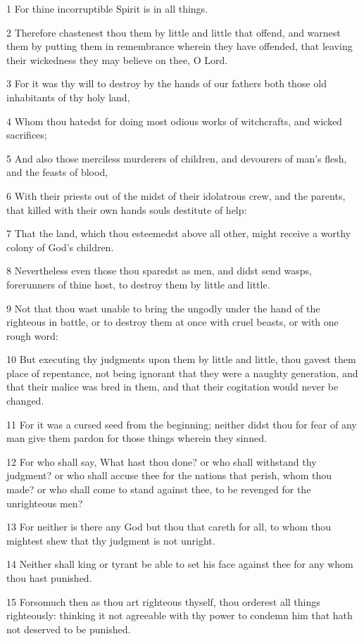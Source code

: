 \par 1 For thine incorruptible Spirit is in all things.
\par 2 Therefore chastenest thou them by little and little that offend, and warnest them by putting them in remembrance wherein they have offended, that leaving their wickedness they may believe on thee, O Lord.
\par 3 For it was thy will to destroy by the hands of our fathers both those old inhabitants of thy holy land,
\par 4 Whom thou hatedst for doing most odious works of witchcrafts, and wicked sacrifices;
\par 5 And also those merciless murderers of children, and devourers of man's flesh, and the feasts of blood,
\par 6 With their priests out of the midst of their idolatrous crew, and the parents, that killed with their own hands souls destitute of help:
\par 7 That the land, which thou esteemedst above all other, might receive a worthy colony of God's children.
\par 8 Nevertheless even those thou sparedst as men, and didst send wasps, forerunners of thine host, to destroy them by little and little.
\par 9 Not that thou wast unable to bring the ungodly under the hand of the righteous in battle, or to destroy them at once with cruel beasts, or with one rough word:
\par 10 But executing thy judgments upon them by little and little, thou gavest them place of repentance, not being ignorant that they were a naughty generation, and that their malice was bred in them, and that their cogitation would never be changed.
\par 11 For it was a cursed seed from the beginning; neither didst thou for fear of any man give them pardon for those things wherein they sinned.
\par 12 For who shall say, What hast thou done? or who shall withstand thy judgment? or who shall accuse thee for the nations that perish, whom thou made? or who shall come to stand against thee, to be revenged for the unrighteous men?
\par 13 For neither is there any God but thou that careth for all, to whom thou mightest shew that thy judgment is not unright.
\par 14 Neither shall king or tyrant be able to set his face against thee for any whom thou hast punished.
\par 15 Forsomuch then as thou art righteous thyself, thou orderest all things righteously: thinking it not agreeable with thy power to condemn him that hath not deserved to be punished.
